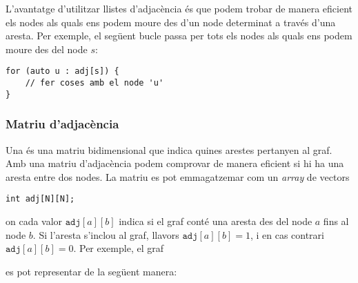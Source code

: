 L'avantatge d'utilitzar llistes d'adjacència és que podem trobar de
manera eficient els nodes als quals ens podem moure des d'un node
determinat a través d'una aresta. Per exemple, el següent bucle passa
per tots els nodes als quals ens podem moure des del node $s$:


\begin{lstlisting}
for (auto u : adj[s]) {
    // fer coses amb el node 'u'
}
\end{lstlisting}


\subsubsection{Matriu d'adjacència}

Una  és una matriu bidimensional que indica
quines arestes pertanyen al graf. Amb una matriu d'adjacència podem
comprovar de manera eficient si hi ha una aresta entre dos nodes. La
matriu es pot emmagatzemar com un \emph{array} de vectors
\begin{lstlisting}
int adj[N][N];
\end{lstlisting}
on cada valor $\texttt{adj}[a][b]$ indica si el graf conté una aresta des del node $a$ fins al node $b$. Si l'aresta s'inclou al graf, llavors $\texttt{adj}[a][b]=1$, i en cas contrari $\texttt{adj}[a][b]=0$. Per exemple, el graf
\begin{center}
\end{center}
es pot representar de la següent manera:
\begin{center}
\end{center}


